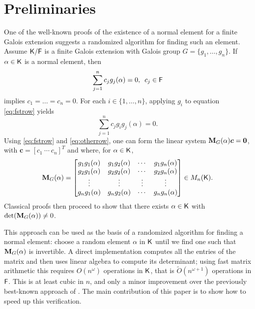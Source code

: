 \section{Preliminaries}
\label{sec:pre}

One of the well-known proofs of the existence of a normal element for a
finite Galois extension \cite[Theorem 6.13.1]{Lang} suggests a randomized
algorithm for finding such an element. Assume ${\mathsf{K}}/{\mathsf{F}}$ is a finite Galois
extension with Galois group $G = \lbrace g_1 , \ldots , g_n \rbrace$. If
$\alpha \in {\mathsf{K}}$ is a normal element, then
\begin{equation}
  \label{eq:fstrow}
  \sum_{j=1}^n 
  c_j g_j(\alpha)=0, \,\,\, c_j \in {\mathsf{F}} 
\end{equation} 
implies $c_1 =\dots=c_n = 0$. For each
$i \in \lbrace 1, \ldots , n\rbrace$, applying $g_i$ to equation
\eqref{eq:fstrow} yields
\begin{equation} \label{eq:otherrow} \sum_{j=1}^n c_j g_i g_j(\alpha)=0.
\end{equation}
Using \eqref{eq:fstrow} and \eqref{eq:otherrow}, one can form the linear
system $\mat{M}_G(\alpha)\boldsymbol{c} = \textbf{0}$,
with $\boldsymbol{c} = [ c_1~ \cdots~c_n]^T$ and
 where, for $\alpha\in{\mathsf{K}}$,
\[
  \mat M_G(\alpha) =
  \begin{bmatrix}
    g_1 g_1(\alpha) & g_1 g_2(\alpha) & \cdots & g_1 g_n(\alpha) \\
    g_2 g_1(\alpha) & g_2 g_2(\alpha) & \cdots & g_2 g_n(\alpha) \\
    \vdots		& \vdots	& \vdots & \vdots \\
    g_n g_1(\alpha) & g_n g_2(\alpha) & \cdots & g_n g_n(\alpha) \\
  \end{bmatrix} \in M_n(\K).
\]
Classical proofs then proceed to show that there exists $\alpha \in {\mathsf{K}}$
with $\det(\mat M_G(\alpha))\neq 0$.
 
This approach can be used as the basis of a randomized algorithm for
finding a normal element: choose a random element $\alpha$ in ${\mathsf{K}}$ until we
find one such that $ \mat M_G(\alpha)$ is invertible. A direct implementation computes
all the entries of the matrix and then uses linear algebra to compute its
determinant; using fast matrix arithmetic this requires $O(n^\omega)$
operations in ${\mathsf{K}}$, that is $\tilde{O}(n^{\omega+1})$ operations in
${\mathsf{F}}$. This is at least cubic in $n$, and only a minor improvement over the
previously best-known approach of . The main contribution
of this paper is to show how to speed up this verification.
 
